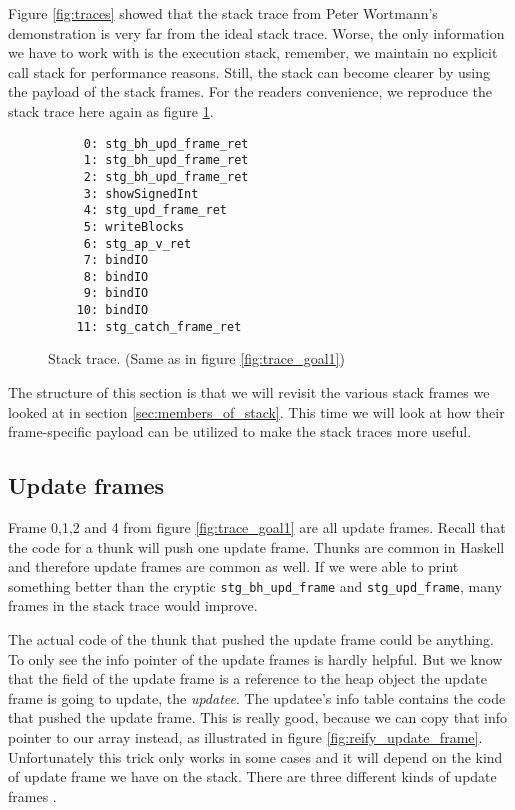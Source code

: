 %

Figure \ref{fig:traces} showed that the stack trace from Peter Wortmann's
demonstration is very far from the ideal stack trace.  Worse, the only
information we have to work with is the execution stack, remember, we maintain no
explicit call stack for performance reasons. Still, the stack can become
clearer by using the payload of the stack frames. For the readers convenience,
we reproduce the stack trace here again as figure \ref{fig:traces_2}.

\begin{figure}
\begin{mdframed}
  \begin{verbatim}
     0: stg_bh_upd_frame_ret
     1: stg_bh_upd_frame_ret
     2: stg_bh_upd_frame_ret
     3: showSignedInt
     4: stg_upd_frame_ret
     5: writeBlocks
     6: stg_ap_v_ret
     7: bindIO
     8: bindIO
     9: bindIO
    10: bindIO
    11: stg_catch_frame_ret
  \end{verbatim}
        \caption{Stack trace. (Same as in figure \ref{fig:trace_goal1})}\label{fig:traces_2}
\end{mdframed}
\end{figure}

The structure of this section is that we will revisit the various
stack frames we looked at in section \ref{sec:members_of_stack}. This
time we will look at how their frame-specific payload can be utilized to make
the stack traces more useful.

\subsection{Update frames} \label{sec:update_frames}

Frame 0,1,2 and 4 from figure \ref{fig:trace_goal1} are all update
frames. Recall that the code for a thunk will push one update
frame. Thunks are common in Haskell and therefore update frames are common
as well. If we were able to print something better
than the cryptic \texttt{stg\_bh\_upd\_frame} and \texttt{stg\_upd\_frame},
many frames in the stack trace would improve.

The actual code of the thunk that pushed the update frame
could be anything. To only see the info pointer of the update frames is hardly helpful.
But we know that the field of the update frame is a reference to the
heap object the update frame is going to update, the \emph{updatee}. The updatee's
info table contains the code that pushed the update frame.
This is really good, because we can copy that info pointer to our array instead,
as illustrated in figure \ref{fig:reify_update_frame}.
Unfortunately this trick only works in some cases and it will depend on the kind of
update frame we have on the stack. There are three different kinds of
update frames \cite{github_updates_cmm}.

